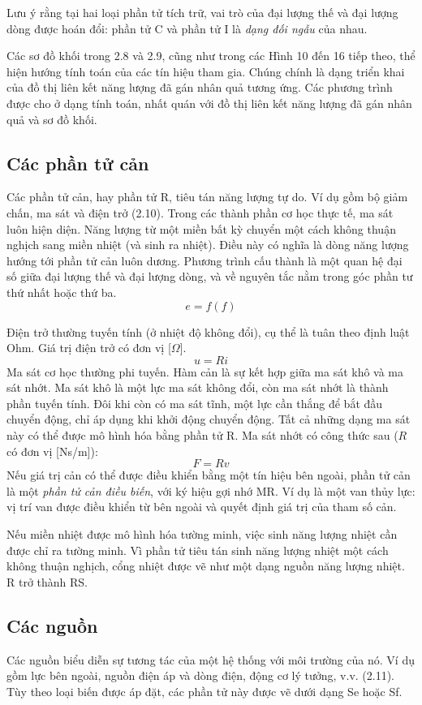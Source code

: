 Lưu ý rằng tại hai loại phần tử tích trữ, vai trò của đại lượng thế và đại lượng dòng được hoán đổi: phần tử C và phần tử I là \emph{dạng đối ngẫu} của nhau.

Các sơ đồ khối trong 2.8 và 2.9, cũng như trong các Hình 10 đến 16 tiếp theo, thể hiện hướng tính toán của các tín hiệu tham gia. Chúng chính là dạng triển khai của đồ thị liên kết năng lượng đã gán nhân quả tương ứng. Các phương trình được cho ở dạng tính toán, nhất quán với đồ thị liên kết năng lượng đã gán nhân quả và sơ đồ khối.

\subsection{Các phần tử cản}
Các phần tử cản, hay phần tử R, tiêu tán năng lượng tự do. Ví dụ gồm bộ giảm chấn, ma sát và điện trở (2.10). Trong các thành phần cơ học thực tế, ma sát luôn hiện diện. Năng lượng từ một miền bất kỳ chuyển một cách không thuận nghịch sang miền nhiệt (và sinh ra nhiệt). Điều này có nghĩa là dòng năng lượng hướng tới phần tử cản luôn
dương. Phương trình cấu thành là một quan hệ đại số giữa đại lượng thế và đại lượng dòng, và về nguyên tắc nằm trong góc phần tư thứ nhất hoặc thứ ba.
\[e=f(f)\]

Điện trở thường tuyến tính (ở nhiệt độ không đổi), cụ thể là tuân theo định luật Ohm. Giá trị điện trở có đơn vị [$\Omega$].
\[u=Ri\]
Ma sát cơ học thường phi tuyến. Hàm cản là sự kết hợp giữa ma sát khô và ma sát nhớt. Ma sát khô là một lực ma sát không đổi, còn ma sát nhớt là thành phần tuyến tính. Đôi khi còn có ma sát tĩnh,
một lực cần thắng để bắt đầu chuyển động, chỉ áp dụng khi khởi động chuyển động. Tất cả những dạng ma sát này có thể được mô hình hóa bằng phần tử R. Ma sát nhớt có công thức sau ($R$ có đơn vị [Ns/m]):
\[F=Rv\]
Nếu giá trị cản có thể được điều khiển bằng một tín hiệu bên ngoài, phần tử cản là một \emph{phần tử cản điều biến}, với ký hiệu gợi nhớ MR. Ví dụ là một van thủy lực: vị trí van được điều khiển từ bên ngoài và quyết định giá trị của tham số cản.

Nếu miền nhiệt được mô hình hóa tường minh, việc sinh năng lượng nhiệt cần được chỉ ra tường minh. Vì phần tử tiêu tán sinh năng lượng nhiệt một cách không thuận nghịch, cổng nhiệt được vẽ như một dạng nguồn năng lượng nhiệt. R trở thành RS.

\subsection{Các nguồn}
Các nguồn biểu diễn sự tương tác của một hệ thống với môi trường của nó. Ví dụ gồm lực bên ngoài, nguồn điện áp và dòng điện, động cơ lý tưởng, v.v. (2.11). Tùy theo loại biến được áp đặt, các phần tử này được vẽ dưới dạng Se hoặc Sf.


